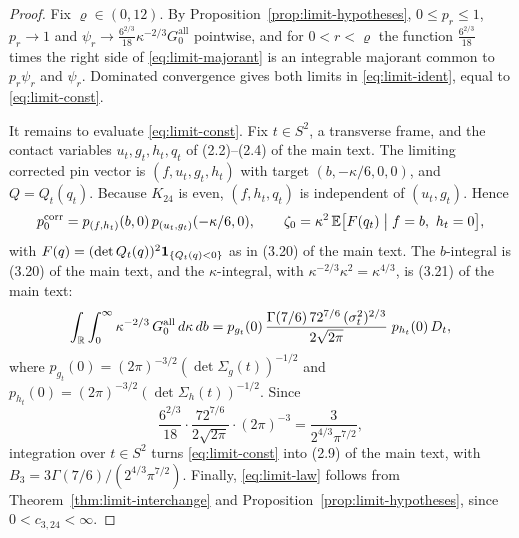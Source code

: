 \begin{proof}
Fix $\varrho\in(0,12)$. By Proposition~\ref{prop:limit-hypotheses}, $0\le p_r\le1$, $p_r\to1$ and $\psi_r\to\frac{6^{2/3}}{18}\kappa^{-2/3}G^{\mathrm{all}}_0$ pointwise, and for $0<r<\varrho$ the function $\frac{6^{2/3}}{18}$ times the right side of \eqref{eq:limit-majorant} is an integrable majorant common to $p_r\psi_r$ and $\psi_r$. Dominated convergence gives both limits in \eqref{eq:limit-ident}, equal to \eqref{eq:limit-const}.

It remains to evaluate \eqref{eq:limit-const}. Fix $t\in S^2$, a transverse frame, and the contact variables $u_t,g_t,h_t,q_t$ of (2.2)--(2.4) of the main text. The limiting corrected pin vector is $(f,u_t,g_t,h_t)$ with target $(b,-\kappa/6,0,0)$, and $Q=Q_t(q_t)$. Because $K_{24}$ is even, $(f,h_t,q_t)$ is independent of $(u_t,g_t)$. Hence
\[
p^{\mathrm{corr}}_0=p_{(f,h_t)}(b,0)\,p_{(u_t,g_t)}(-\kappa/6,0),\qquad \zeta_0=\kappa^2\,\mathbb E\bigl[F(q_t)\bigm|f=b,\ h_t=0\bigr],
\]
with $F(q)=(\det Q_t(q))^2\mathbf 1_{\{Q_t(q)<0\}}$ as in (3.20) of the main text. The $b$-integral is (3.20) of the main text, and the $\kappa$-integral, with $\kappa^{-2/3}\kappa^2=\kappa^{4/3}$, is (3.21) of the main text:
\[
\int_{\mathbb R}\int_0^\infty\kappa^{-2/3}\,G^{\mathrm{all}}_0\,d\kappa\,db=p_{g_t}(0)\,\frac{\Gamma(7/6)\,72^{7/6}\,(\sigma_t^2)^{2/3}}{2\sqrt{2\pi}}\;p_{h_t}(0)\,D_t,
\]
where $p_{g_t}(0)=(2\pi)^{-3/2}(\det\Sigma_g(t))^{-1/2}$ and $p_{h_t}(0)=(2\pi)^{-3/2}(\det\Sigma_h(t))^{-1/2}$. Since
\[
\frac{6^{2/3}}{18}\cdot\frac{72^{7/6}}{2\sqrt{2\pi}}\cdot(2\pi)^{-3}=\frac{3}{2^{4/3}\pi^{7/2}},
\]
integration over $t\in S^2$ turns \eqref{eq:limit-const} into (2.9) of the main text, with $B_3=3\Gamma(7/6)/(2^{4/3}\pi^{7/2})$. Finally, \eqref{eq:limit-law} follows from Theorem~\ref{thm:limit-interchange} and Proposition~\ref{prop:limit-hypotheses}, since $0<c_{3,24}<\infty$.
\end{proof}
